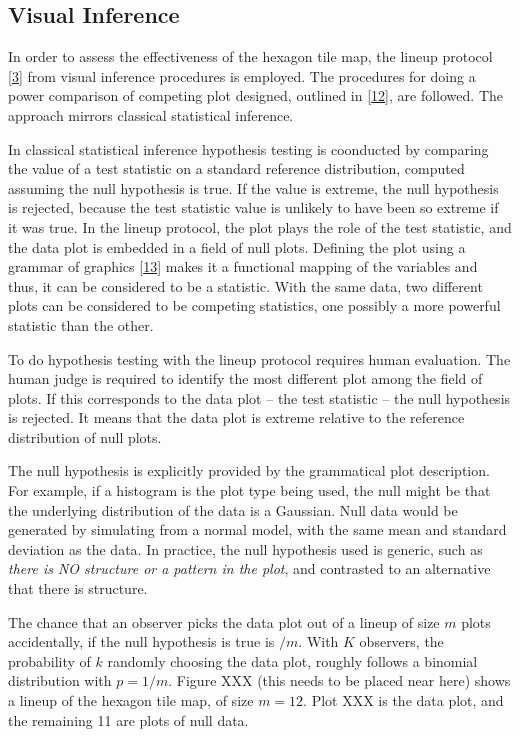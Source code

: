 \documentclass[conference,final,]{IEEEtran}
\begin{document}
\hypertarget{visual-inference}{%
\subsection{Visual Inference}\label{visual-inference}}

In order to assess the effectiveness of the hexagon tile map, the lineup protocol {[}\protect\hyperlink{ref-GIIV}{3}{]} from visual inference procedures is employed. The procedures for doing a power comparison of competing plot designed, outlined in {[}\protect\hyperlink{ref-GTPCCD}{12}{]}, are followed. The approach mirrors classical statistical inference.

In classical statistical inference hypothesis testing is coonducted by comparing the value of a test statistic on a standard reference distribution, computed assuming the null hypothesis is true. If the value is extreme, the null hypothesis is rejected, because the test statistic value is unlikely to have been so extreme if it was true. In the lineup protocol, the plot plays the role of the test statistic, and the data plot is embedded in a field of null plots. Defining the plot using a grammar of graphics {[}\protect\hyperlink{ref-ggplot2}{13}{]} makes it a functional mapping of the variables and thus, it can be considered to be a statistic. With the same data, two different plots can be considered to be competing statistics, one possibly a more powerful statistic than the other.

To do hypothesis testing with the lineup protocol requires human evaluation. The human judge is required to identify the most different plot among the field of plots. If this corresponds to the data plot -- the test statistic -- the null hypothesis is rejected. It means that the data plot is extreme relative to the reference distribution of null plots.

The null hypothesis is explicitly provided by the grammatical plot description. For example, if a histogram is the plot type being used, the null might be that the underlying distribution of the data is a Gaussian. Null data would be generated by simulating from a normal model, with the same mean and standard deviation as the data. In practice, the null hypothesis used is generic, such as \emph{there is NO structure or a pattern in the plot}, and contrasted to an alternative that there is structure.

The chance that an observer picks the data plot out of a lineup of size \(m\) plots accidentally, if the null hypothesis is true is \(/m\). With \(K\) observers, the probability of \(k\) randomly choosing the data plot, roughly follows a binomial distribution with \(p=1/m\). Figure XXX (this needs to be placed near here) shows a lineup of the hexagon tile map, of size \(m=12\). Plot XXX is the data plot, and the remaining 11 are plots of null data.
\end{document}
